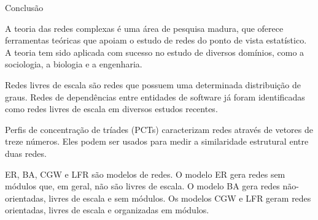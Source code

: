 \begin{section}{Conclusão} %
	
	A teoria das redes complexas é uma área de pesquisa madura, que oferece ferramentas teóricas que apoiam o estudo de redes do ponto de vista estatístico. A teoria tem sido aplicada com sucesso no estudo de diversos domínios, como a sociologia, a biologia e a engenharia.
	
	Redes livres de escala são redes que possuem uma determinada distribuição de graus. Redes de dependências entre entidades de software já foram identificadas como redes livres de escala em diversos estudos recentes.
	
	Perfis de concentração de tríades (PCTs) caracterizam redes através de vetores de treze números. Eles podem ser usados para medir a similaridade estrutural entre duas redes.
	
	ER, BA, CGW e LFR são modelos de redes. O modelo ER gera redes sem módulos que, em geral, não são livres de escala. O modelo BA gera redes não-orientadas, livres de escala e sem módulos. Os modelos CGW e LFR geram redes orientadas, livres de escala e organizadas em módulos.
		
\end{section}

% 
% 
% 
% 
% 	
% 	
